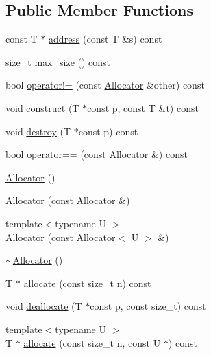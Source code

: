 \subsection*{Public Member Functions}
\begin{DoxyCompactItemize}
\item 
const T $\ast$ \hyperlink{classSLB_1_1Allocator_ab7102bf82e5cfc5043bed63175f1956b}{address} (const T \&s) const 
\item 
size\+\_\+t \hyperlink{classSLB_1_1Allocator_afe13085cb89de16cc01bd90bfe906c80}{max\+\_\+size} () const 
\item 
bool \hyperlink{classSLB_1_1Allocator_a1373f10269a64c68010275261614d7f1}{operator!=} (const \hyperlink{classSLB_1_1Allocator}{Allocator} \&other) const 
\item 
void \hyperlink{classSLB_1_1Allocator_aef81a6cff2e4fdfb7ebc842582915bd5}{construct} (T $\ast$const p, const T \&t) const 
\item 
void \hyperlink{classSLB_1_1Allocator_a4342af7f1e79fe79e93953563ea2227d}{destroy} (T $\ast$const p) const 
\item 
bool \hyperlink{classSLB_1_1Allocator_a2d5829cf4bb6c1906e77312ff0419cd8}{operator==} (const \hyperlink{classSLB_1_1Allocator}{Allocator} \&) const 
\item 
\hyperlink{classSLB_1_1Allocator_ab4ca47d37a07b142dd30f7c493812356}{Allocator} ()
\item 
\hyperlink{classSLB_1_1Allocator_a284123183110be003dd66ae78a38de0b}{Allocator} (const \hyperlink{classSLB_1_1Allocator}{Allocator} \&)
\item 
{\footnotesize template$<$typename U $>$ }\\\hyperlink{classSLB_1_1Allocator_aa185cf7ab9c4e5db80066e600a9b1fda}{Allocator} (const \hyperlink{classSLB_1_1Allocator}{Allocator}$<$ U $>$ \&)
\item 
\hyperlink{classSLB_1_1Allocator_a82355668e25cd1a67f0731d8b2fc7fd8}{$\sim$\+Allocator} ()
\item 
T $\ast$ \hyperlink{classSLB_1_1Allocator_a32139c6695adb0ebe7efc19fcd051028}{allocate} (const size\+\_\+t n) const 
\item 
void \hyperlink{classSLB_1_1Allocator_affb6e4a238f1125dbc029370a7b3f7e9}{deallocate} (T $\ast$const p, const size\+\_\+t) const 
\item 
{\footnotesize template$<$typename U $>$ }\\T $\ast$ \hyperlink{classSLB_1_1Allocator_aa4875dd70b320f8b72bb5fbd921998a2}{allocate} (const size\+\_\+t n, const U $\ast$) const 
\end{DoxyCompactItemize}
